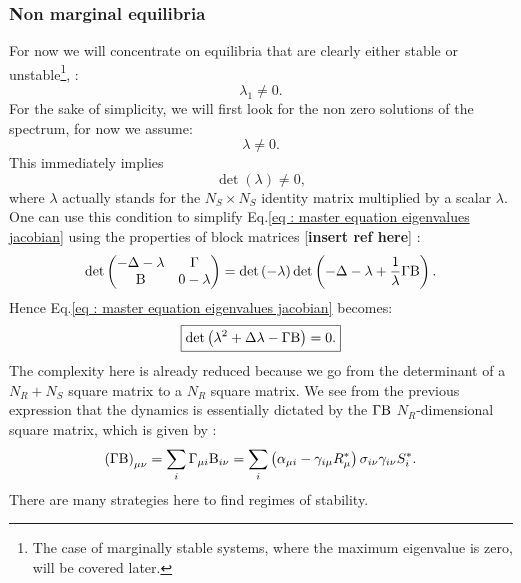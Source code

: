 \documentclass[12pt]{report}
\begin{document}
\subsubsection{Non marginal equilibria}\label{section : non marginal equilibria}
For now we will concentrate on equilibria that are clearly either stable or unstable\footnote{The case of marginally stable systems, where the maximum eigenvalue is zero, will be covered later.}, \ie:
\begin{equation}
\lambda_1 \neq 0.
\end{equation}
For the sake of simplicity, we will first look for the non zero solutions of the spectrum, \ie for now we assume:
\begin{equation}
\lambda \neq 0.
\end{equation}
This immediately implies
\begin{equation}
\det\left(\lambda\right)\neq 0,
\end{equation}
where $\lambda$ actually stands for the $N_S \times N_S$ identity matrix multiplied by a scalar $\lambda$. One can use this condition to simplify Eq.\eqref{eq : master equation eigenvalues jacobian} using the properties of block matrices [\textbf{insert ref here}] :
\begin{equation}
\det
\begin{pmatrix}
  -\Delta - \lambda  & \Gamma \\
  \text{B} & 0-\lambda
\end{pmatrix} =
\det\left(-\lambda\right)\det\left(-\Delta- \lambda+\frac{1}{\lambda}\Gamma \text{B}\right).
\end{equation}
Hence Eq.\eqref{eq : master equation eigenvalues jacobian} becomes:
\begin{equation}
\boxed{
\det\left(\lambda^2+\Delta \lambda-\Gamma \text{B}\right)=0.
}\label{eq : lambda equation}
\end{equation}
The complexity here is already reduced because we go from the determinant of a $N_R+N_S$ square matrix to a $N_R$ square matrix. We see from the previous expression that the dynamics is essentially dictated by the $\Gamma \text{B}$ $N_R$-dimensional square matrix, which is given by :
\begin{equation}
\left(\Gamma \text{B}\right)_{\mu \nu} = \sum_i \Gamma_{\mu i} \text{B}_{i \nu} = \sum_i \left(\alpha_{\mu i}-\gamma_{i \mu} R^*_\mu \right)\sigma_{i\nu}\gamma_{i\nu}S^*_i.
\end{equation}
There are many strategies here to find regimes of stability.
\end{document}
